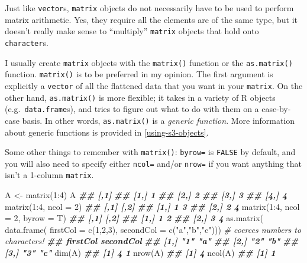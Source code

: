 \documentclass[
  12pt,
  krantz2]{krantz}
\makeatletter
\newenvironment{Shaded}{\begin{snugshade}}{\end{snugshade}}
\newcommand{\AttributeTok}[1]{\textcolor[rgb]{0.61,0.61,0.61}{#1}}
\newcommand{\CommentTok}[1]{\textcolor[rgb]{0.37,0.37,0.37}{\textit{#1}}}
\newcommand{\DecValTok}[1]{\textcolor[rgb]{0.06,0.06,0.06}{#1}}
\newcommand{\DocumentationTok}[1]{\textcolor[rgb]{0.37,0.37,0.37}{\textbf{\textit{#1}}}}
\newcommand{\FunctionTok}[1]{\textcolor[rgb]{0,0,0}{#1}}
\newcommand{\NormalTok}[1]{#1}
\newcommand{\OtherTok}[1]{\textcolor[rgb]{0.37,0.37,0.37}{#1}}
\newcommand{\SpecialCharTok}[1]{\textcolor[rgb]{0,0,0}{#1}}
\newcommand{\StringTok}[1]{\textcolor[rgb]{0.5,0.5,0.5}{#1}}
\newenvironment{kframe}{%
\medskip{}
\setlength{\fboxsep}{.8em}
 \def\at@end@of@kframe{}%
 \ifinner\ifhmode%
  \def\at@end@of@kframe{\end{minipage}}%
  \begin{minipage}{\columnwidth}%
 \fi\fi%
 \def\FrameCommand##1{\hskip\@totalleftmargin \hskip-\fboxsep
 \colorbox{shadecolor}{##1}\hskip-\fboxsep
     \hskip-\linewidth \hskip-\@totalleftmargin \hskip\columnwidth}%
 \MakeFramed {\advance\hsize-\width
   \@totalleftmargin\z@ \linewidth\hsize
   \@setminipage}}%
 {\par\unskip\endMakeFramed%
 \at@end@of@kframe}
\renewenvironment{Shaded}{\begin{kframe}}{\end{kframe}}
\makeatother
\begin{document}
\begin{rmd-caution}
Just like \texttt{vector}s, \texttt{matrix} objects do not necessarily have to be used to perform matrix arithmetic. Yes, they require all the elements are of the same type, but it doesn't really make sense to ``multiply'' \texttt{matrix} objects that hold onto \texttt{character}s.

\end{rmd-caution}

I usually create \texttt{matrix} objects with the \texttt{matrix()} function or the \texttt{as.matrix()} function. \texttt{matrix()} is to be preferred in my opinion. The first argument is explicitly a \texttt{vector} of all the flattened data that you want in your \texttt{matrix}. On the other hand, \texttt{as.matrix()} is more flexible; it takes in a variety of R objects (e.g.~\texttt{data.frame}s), and tries to figure out what to do with them on a case-by-case basis. In other words, \texttt{as.matrix()} is a \emph{generic function}. More information about generic functions is provided in \ref{using-s3-objects}.

Some other things to remember with \texttt{matrix()}: \texttt{byrow=} is \texttt{FALSE} by default, and you will also need to specify either \texttt{ncol=} and/or \texttt{nrow=} if you want anything that isn't a 1-column \texttt{matrix}.

\begin{Shaded}
\begin{Highlighting}[]
\NormalTok{A }\OtherTok{\textless{}{-}} \FunctionTok{matrix}\NormalTok{(}\DecValTok{1}\SpecialCharTok{:}\DecValTok{4}\NormalTok{)}
\NormalTok{A}
\DocumentationTok{\#\#      [,1]}
\DocumentationTok{\#\# [1,]    1}
\DocumentationTok{\#\# [2,]    2}
\DocumentationTok{\#\# [3,]    3}
\DocumentationTok{\#\# [4,]    4}
\FunctionTok{matrix}\NormalTok{(}\DecValTok{1}\SpecialCharTok{:}\DecValTok{4}\NormalTok{, }\AttributeTok{ncol =} \DecValTok{2}\NormalTok{)}
\DocumentationTok{\#\#      [,1] [,2]}
\DocumentationTok{\#\# [1,]    1    3}
\DocumentationTok{\#\# [2,]    2    4}
\FunctionTok{matrix}\NormalTok{(}\DecValTok{1}\SpecialCharTok{:}\DecValTok{4}\NormalTok{, }\AttributeTok{ncol =} \DecValTok{2}\NormalTok{, }\AttributeTok{byrow =}\NormalTok{ T)}
\DocumentationTok{\#\#      [,1] [,2]}
\DocumentationTok{\#\# [1,]    1    2}
\DocumentationTok{\#\# [2,]    3    4}
\FunctionTok{as.matrix}\NormalTok{(}
  \FunctionTok{data.frame}\NormalTok{(}
    \AttributeTok{firstCol =} \FunctionTok{c}\NormalTok{(}\DecValTok{1}\NormalTok{,}\DecValTok{2}\NormalTok{,}\DecValTok{3}\NormalTok{),}
    \AttributeTok{secondCol =} \FunctionTok{c}\NormalTok{(}\StringTok{"a"}\NormalTok{,}\StringTok{"b"}\NormalTok{,}\StringTok{"c"}\NormalTok{))) }\CommentTok{\# coerces numbers to characters!}
\DocumentationTok{\#\#      firstCol secondCol}
\DocumentationTok{\#\# [1,] "1"      "a"      }
\DocumentationTok{\#\# [2,] "2"      "b"      }
\DocumentationTok{\#\# [3,] "3"      "c"}
\FunctionTok{dim}\NormalTok{(A)}
\DocumentationTok{\#\# [1] 4 1}
\FunctionTok{nrow}\NormalTok{(A)}
\DocumentationTok{\#\# [1] 4}
\FunctionTok{ncol}\NormalTok{(A)}
\DocumentationTok{\#\# [1] 1}
\end{Highlighting}
\end{Shaded}
\end{document}
